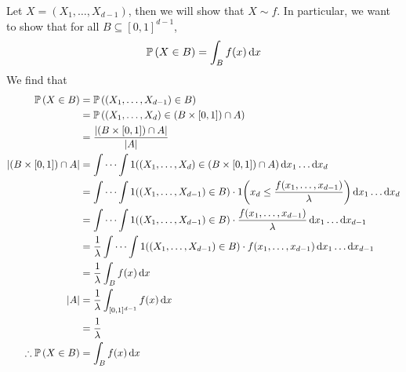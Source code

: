 Let \(X = (X_1, \dots, X_{d-1})\), then we will show that \(X \sim f\).
In particular, we want to show that for all \(B \subseteq [0, 1]^{d-1}\),
\[
	\mathbb{P}\left({X \in B}\right) = \int_B f(x) \dd{x}
\]
We find that
\begin{align*}
	\mathbb{P}\left({X \in B}\right)                 & = \mathbb{P}\left({(X_1, \dots, X_{d-1}) \in B}\right)                                                                                           \\
	                               & = \mathbb{P}\left({(X_1, \dots, X_d) \in (B \times [0, 1]) \cap A}\right)                                                                        \\
	                               & = \frac{\abs{(B \times [0, 1]) \cap A}}{\abs{A}}                                                                               \\
	\abs{(B \times [0, 1]) \cap A} & = \idotsint 1((X_1, \dots, X_d) \in (B \times [0, 1]) \cap A) \dd{x_1} \dots \dd{x_d}                                          \\
	                               & = \idotsint 1((X_1, \dots, X_{d-1}) \in B)\cdot 1\qty(x_d \leq \frac{f(x_1, \dots, x_{d-1})}{\lambda}) \dd{x_1} \dots \dd{x_d} \\
	                               & = \idotsint 1((X_1, \dots, X_{d-1}) \in B)\cdot \frac{f(x_1, \dots, x_{d-1})}{\lambda} \dd{x_1} \dots \dd{x_{d-1}}             \\
	                               & = \frac{1}{\lambda} \idotsint 1((X_1, \dots, X_{d-1}) \in B)\cdot f(x_1, \dots, x_{d-1}) \dd{x_1} \dots \dd{x_{d-1}}           \\
	                               & = \frac{1}{\lambda} \int_B f(x) \dd{x}                                                                                         \\
	\abs{A}                        & = \frac{1}{\lambda} \int_{[0,1]^{d-1}} f(x) \dd{x}                                                                             \\
	                               & = \frac{1}{\lambda}                                                                                                            \\
	\therefore \mathbb{P}\left({X \in B}\right)      & = \int_B f(x) \dd{x}
\end{align*}


